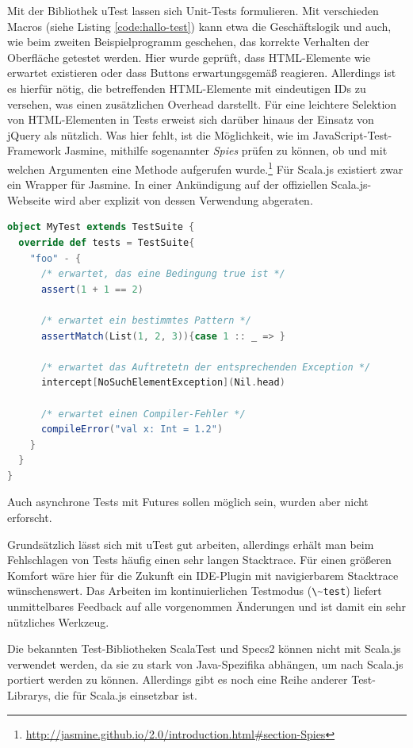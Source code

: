\documentclass[a4paper, 12pt, hidelinks, listof=totoc, listoftables=totoc, bibliography=totoc]{scrreprt}
\newcommand{\code}[1]{\lstinline[language=Scala, style=inline]|#1|}
\begin{document}
Mit der Bibliothek uTest lassen sich Unit-Tests formulieren. Mit verschieden Macros (siehe Listing \ref{code:hallo-test}) kann etwa die Geschäftslogik und auch, wie beim zweiten Beispielprogramm geschehen, das korrekte Verhalten der Oberfläche getestet werden. Hier wurde geprüft, dass \ac{HTML}-Elemente wie erwartet existieren oder dass Buttons erwartungsgemäß reagieren. Allerdings ist es hierfür nötig, die betreffenden \ac{HTML}-Elemente mit eindeutigen IDs zu versehen, was einen zusätzlichen Overhead darstellt. Für eine leichtere Selektion von \ac{HTML}-Elementen in Tests erweist sich darüber hinaus der Einsatz von jQuery als nützlich. Was hier fehlt, ist die Möglichkeit, wie im JavaScript-Test-Framework Jasmine, mithilfe sogenannter \emph{Spies} prüfen zu können, ob und mit welchen Argumenten eine Methode aufgerufen wurde.\footnote{\url{http://jasmine.github.io/2.0/introduction.html\#section-Spies}} Für Scala.js existiert zwar ein Wrapper für Jasmine. In einer Ankündigung auf der offiziellen Scala.js-Webseite \cite{scalajs.ASJ} wird aber explizit von dessen Verwendung abgeraten.

\begin{lstlisting}[language=Scala, caption={Eine beispielhafte Test-Suite mit uTest.}, label={code:hallo-test}]
object MyTest extends TestSuite {
  override def tests = TestSuite{
    "foo" - {
      /* erwartet, das eine Bedingung true ist */
      assert(1 + 1 == 2)
      
      /* erwartet ein bestimmtes Pattern */
      assertMatch(List(1, 2, 3)){case 1 :: _ => }
      
      /* erwartet das Auftretetn der entsprechenden Exception */
      intercept[NoSuchElementException](Nil.head)
      
      /* erwartet einen Compiler-Fehler */
      compileError("val x: Int = 1.2")
    }
  }
}
\end{lstlisting}

Auch asynchrone Tests mit Futures sollen möglich sein, wurden aber nicht erforscht.

Grundsätzlich lässt sich mit uTest gut arbeiten, allerdings erhält man beim Fehlschlagen von Tests häufig einen sehr langen Stacktrace. Für einen größeren Komfort wäre hier für die Zukunft ein IDE-Plugin mit navigierbarem Stacktrace wünschenswert. Das Arbeiten im kontinuierlichen Testmodus (\code{\~test}) liefert unmittelbares Feedback auf alle vorgenommen Änderungen und ist damit ein sehr nützliches Werkzeug.


Die bekannten Test-Bibliotheken ScalaTest und Specs2 können nicht mit Scala.js verwendet werden, da sie zu stark von Java-Spezifika abhängen, um nach Scala.js portiert werden zu können. Allerdings gibt es noch eine Reihe anderer Test-Librarys, die für Scala.js einsetzbar ist. \cite[\#OtherTestingLibraries]{haoyi.HOS}
\end{document}

